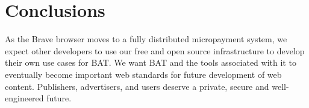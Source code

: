 \documentclass[twocolumn,9pt]{article}
\newcommand{\bat}{\textsf{BAT}\xspace}
\begin{document}
\section{Conclusions}
As the Brave browser moves to a fully distributed micropayment system, we expect other developers to use our free and open source infrastructure to develop their own use cases for \bat. 
We want \bat and the tools associated with it to eventually become important web standards for future development of web content. 
Publishers, advertisers, and users deserve a private, secure and well-engineered future.

{
\setlength{\bibsep}{0pt plus 0.3ex}

\footnotesize


}
\end{document}
